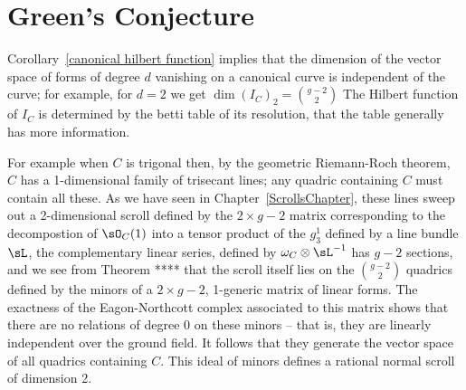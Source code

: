 %
%
%

\section{Green's Conjecture}

Corollary~\ref{canonical hilbert function} implies that the dimension of the vector space of forms of degree $d$
vanishing on a canonical curve is independent of the curve; for example, for $d=2$ we get
$
\dim ({I_{C}})_{2} = {g-2\choose 2}
$
The Hilbert function of $I_C$ is determined by the betti table of its resolution, that the table generally has more information.

 For example
when $C$ is trigonal then, by the geometric Riemann-Roch theorem, $C$ has a 1-dimensional family of trisecant lines; any quadric containing $C$ must contain all these. As we have seen in Chapter~\ref{ScrollsChapter}, these lines sweep
out a 2-dimensional scroll defined by the $2\times g-2$ matrix corresponding to the decompostion of $\sO_C(1)$
into a tensor product of the $g^{1}_{3}$ defined by a line bundle $\sL$, the complementary linear series,
defined by $\omega_{C}\otimes \sL^{-1}$ has $g-2$ sections, and we see from Theorem ****
that the scroll itself lies on the ${g-2\choose 2}$ quadrics defined by the minors of a $2\times g-2$, 1-generic matrix of linear forms. The exactness of the Eagon-Northcott complex associated to this matrix shows that there are no relations of degree 0 on these minors -- that is, they are linearly independent over the ground field. It follows that they generate the vector space of all quadrics containing $C$. This
ideal of minors defines a rational normal scroll of dimension 2.

